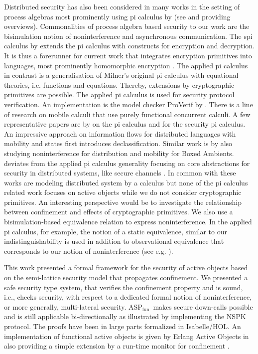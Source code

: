 \documentclass[10pt, conference, compsocconf]{IEEEtran}
\newcommand\aspfun{ASP${}_\text{fun}$\ }
\begin{document}
{Distributed security has also been considered in many works in the setting of process algebras
most prominently using pi calculus by \cite{Mil:89}
(see \cite{fg:95} and \cite{rsglr:00} providing overviews). 
Commonalities of process algebra based security to our work are the bisimulation notion of 
noninterference and asynchronous communication. 
The spi calculus by \cite{ag:97} extends the pi calculus with constructs for encryption and
decryption. It is thus a forerunner for current work that integrates encryption primitives
into languages, most prominently homomorphic encryption \cite{fpr:11}.
The applied pi calculus \cite{af:01} in contrast is a generalisation of Milner's original
pi calculus with equational theories, i.e. functions and equations.
Thereby, extensions by cryptographic primitives are possible.
The applied pi calculus is used for security protocol verification. An 
implementation is the model checker ProVerif by \cite{cb:13}. 
There is a line of research on mobile calculi that use purely functional concurrent
calculi. A few representative papers are by \cite{hvy:00} on the pi calculus and
\cite{hr:02} for the security pi calculus. 
An impressive approach on information flows for distributed languages with mobility and states 
\cite{mc:11} first introduces declassification. Similar work is by \cite{bcc:01} also studying 
noninterference for distribution and mobility for Boxed Ambients.
\cite{bf:08} deviates from the applied pi calculus generality focusing on core abstractions
for security in distributed systems, like secure channels \cite{bf:10}.
In common with these works are modeling distributed system by a calculus but 
none of the pi calculus related work focuses on active objects while we do not
consider cryptographic primitives.
An interesting perspective would be to investigate the relationship between confinement
and effects of cryptographic primitives.
We also use a bisimulation-based equivalence relation to express noninterference.
In the applied pi calculus, for example, the notion of a static equivalence, similar
to our indistinguishability is used in addition to observational equivalence
that corresponds to our notion of noninterference (see e.g. \cite{dkr:10}). 

This work presented a formal framework for the security of active objects based on 
the semi-lattice security model that propagates confinement.  
We presented a safe security type system, that verifies the confinement property  and
is sound, i.e., checks security, with respect to a dedicated formal notion of noninterference, 
or more generally, multi-lateral security. 
\aspfun makes secure down-calls possible and is still applicable bi-directionally as 
illustrated by implementing the NSPK protocol. 
The proofs have been in large parts formalized in Isabelle/HOL.
An implementation of functional active objects is given by Erlang Active Objects in \cite{fk:10}
also providing a simple extension by a run-time monitor for confinement \cite{fk:11}.



}
\end{document}

